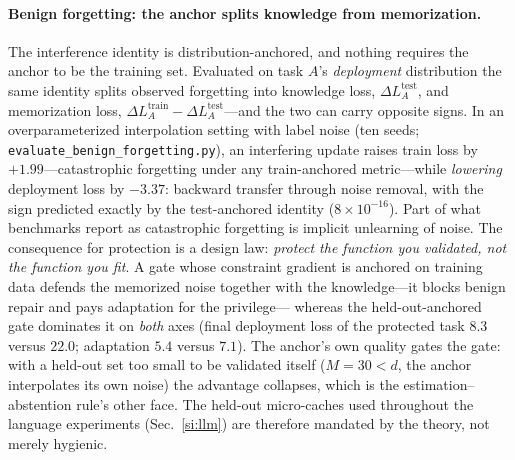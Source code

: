 \documentclass[10pt,a4paper]{article}
\theoremstyle{plain}
\theoremstyle{definition}
\begin{document}
\paragraph{Benign forgetting: the anchor splits knowledge from memorization.} The
interference identity is distribution-anchored, and nothing requires the anchor to be
the training set. Evaluated on task $A$'s \emph{deployment} distribution the same
identity splits observed forgetting into knowledge loss, $\Delta L_A^{\mathrm{test}}$,
and memorization loss, $\Delta L_A^{\mathrm{train}}-\Delta L_A^{\mathrm{test}}$---and
the two can carry opposite signs. In an overparameterized interpolation setting with
label noise (ten seeds; \texttt{evaluate\_benign\_forgetting.py}), an interfering update
raises train loss by $+1.99$---catastrophic forgetting under any train-anchored
metric---while \emph{lowering} deployment loss by $-3.37$: backward transfer through
noise removal, with the sign predicted exactly by the test-anchored identity
($8\times10^{-16}$). Part of what benchmarks report as catastrophic forgetting is
implicit unlearning of noise. The consequence for protection is a design law:
\emph{protect the function you validated, not the function you fit}. A gate whose
constraint gradient is anchored on training data defends the memorized noise together
with the knowledge---it blocks benign repair and pays adaptation for the privilege---
whereas the held-out-anchored gate dominates it on \emph{both} axes (final deployment
loss of the protected task $8.3$ versus $22.0$; adaptation $5.4$ versus $7.1$). The
anchor's own quality gates the gate: with a held-out set too small to be validated
itself ($M=30<d$, the anchor interpolates its own noise) the advantage collapses,
which is the estimation--abstention rule's other face. The held-out micro-caches used
throughout the language experiments (Sec.~\ref{si:llm}) are therefore mandated by the
theory, not merely hygienic.
\end{document}
